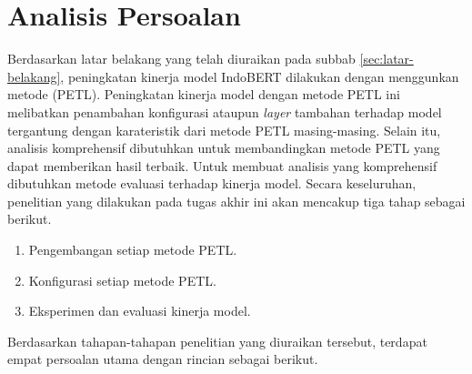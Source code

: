 \section{Analisis Persoalan}
\label{sec:analisis-persoalan}

Berdasarkan latar belakang yang telah diuraikan pada subbab \ref{sec:latar-belakang}, peningkatan kinerja model IndoBERT dilakukan dengan menggunkan metode \PETL (PETL). Peningkatan kinerja model dengan metode PETL ini melibatkan penambahan konfigurasi ataupun \textit{layer} tambahan terhadap model tergantung dengan karateristik dari metode PETL masing-masing. Selain itu, analisis komprehensif dibutuhkan untuk membandingkan metode PETL yang dapat memberikan hasil terbaik. Untuk membuat analisis yang komprehensif dibutuhkan metode evaluasi terhadap kinerja model. Secara keseluruhan, penelitian yang dilakukan pada tugas akhir ini akan mencakup tiga tahap sebagai berikut.

\begin{enumerate}
    \item Pengembangan setiap metode PETL.
    \item Konfigurasi setiap metode PETL.
    \item Eksperimen dan evaluasi kinerja model.
\end{enumerate}

Berdasarkan tahapan-tahapan penelitian yang diuraikan tersebut, terdapat empat persoalan utama dengan rincian sebagai berikut.

